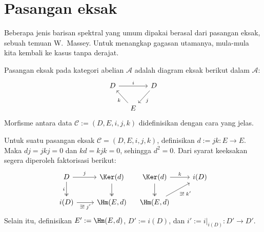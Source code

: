 
\section{Pasangan eksak}\label{sec:exact-couples}
\hypertarget{o014.aljabr2.chapter5.exact-couples}{ }

Beberapa jenis barisan spektral yang umum dipakai berasal dari pasangan eksak,
sebuah temuan W.\ Massey. Untuk menangkap gagasan utamanya, mula-mula kita
kembali ke kasus tanpa derajat.

\begin{definition}\label{def:exact-couple}
	Pasangan eksak pada kategori abelian $\mathcal{A}$ adalah diagram eksak
	berikut dalam $\mathcal{A}$:
	\[\begin{tikzcd}[column sep=small]
		D \arrow[rr, "i"] & & D \arrow[ld, "j"] \\
		& E \arrow[lu, "k"] &
	\end{tikzcd}\]
	Morfisme antara data $\mathscr{C}:=(D,E,i,j,k)$ didefinisikan dengan
	cara yang jelas.
\end{definition}

Untuk suatu pasangan eksak $\mathscr{C}=(D,E,i,j,k)$, definisikan
$d:=jk:E\to E$. Maka $dj=jkj=0$ dan $kd=kjk=0$, sehingga $d^2=0$.
Dari syarat keeksakan segera diperoleh faktorisasi berikut:
\begin{equation}\label{eqn:exact-couple-aux}
	\begin{tikzcd}
		D \arrow[r, "j"] \arrow[twoheadrightarrow, d, "i"'] &
		\Ker(d) \arrow[twoheadrightarrow, d] \\
		i(D) \arrow[r, "{\exists!\;j'}"'] & \Hm(E,d)
	\end{tikzcd} \quad \begin{tikzcd}
		\Ker(d) \arrow[r, "k"] \arrow[twoheadrightarrow, d] & i(D) \\
		\Hm(E,d) \arrow[ru, "{\exists!\;k'}"'] &
	\end{tikzcd}
\end{equation}
Selain itu, definisikan $E':=\Hm(E,d)$, $D':=i(D)$, dan
$i':=i|_{i(D)}:D'\to D'$.

